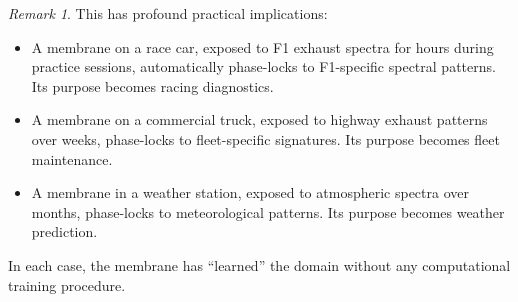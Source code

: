 \documentclass[11pt,twocolumn,a4paper]{article}
\theoremstyle{definition}
\theoremstyle{remark}
\newtheorem{remark}[theorem]{Remark}
\begin{document}
\begin{remark}
This has profound practical implications:
\begin{itemize}
    \item A membrane on a race car, exposed to F1 exhaust spectra for hours during practice sessions, automatically phase-locks to F1-specific spectral patterns.  Its purpose becomes racing diagnostics.
    \item A membrane on a commercial truck, exposed to highway exhaust patterns over weeks, phase-locks to fleet-specific signatures.  Its purpose becomes fleet maintenance.
    \item A membrane in a weather station, exposed to atmospheric spectra over months, phase-locks to meteorological patterns.  Its purpose becomes weather prediction.
\end{itemize}
In each case, the membrane has ``learned'' the domain without any computational training procedure.
\end{remark}
\end{document}
